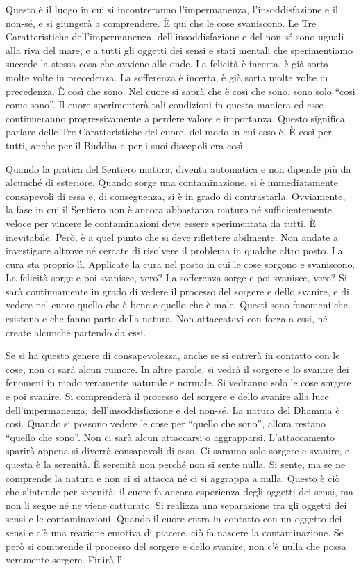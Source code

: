 Questo è il luogo in cui si incontreranno l'impermanenza,
l'insoddisfazione e il non-sé, e si giungerà a comprendere. È qui che le
cose svaniscono. Le Tre Caratteristiche dell'impermanenza,
dell'insoddisfazione e del non-sé sono uguali alla riva del mare, e a
tutti gli oggetti dei sensi e stati mentali che sperimentiamo succede la
stessa cosa che avviene alle onde. La felicità è incerta, è già sorta
molte volte in precedenza. La sofferenza è incerta, è già sorta molte
volte in precedenza. È così che sono. Nel cuore si saprà che è così che
sono, sono solo ``così come sono''. Il cuore sperimenterà tali
condizioni in questa maniera ed esse continueranno progressivamente a
perdere valore e importanza. Questo significa parlare delle Tre
Caratteristiche del cuore, del modo in cui esso è. È così per tutti,
anche per il Buddha e per i suoi discepoli era così

Quando la pratica del Sentiero matura, diventa automatica e non dipende
più da alcunché di esteriore. Quando sorge una contaminazione, si è
immediatamente consapevoli di essa e, di conseguenza, si è in grado di
contrastarla. Ovviamente, la fase in cui il Sentiero non è ancora
abbastanza maturo né sufficientemente veloce per vincere le
contaminazioni deve essere sperimentata da tutti. È inevitabile. Però, è
a quel punto che si deve riflettere abilmente. Non andate a investigare
altrove né cercate di risolvere il problema in qualche altro posto. La
cura sta proprio lì. Applicate la cura nel posto in cui le cose sorgono
e svaniscono. La felicità sorge e poi svanisce, vero? La sofferenza
sorge e poi svanisce, vero? Si sarà continuamente in grado di vedere il
processo del sorgere e dello svanire, e di vedere nel cuore quello che è
bene e quello che è male. Questi sono fenomeni che esistono e che fanno
parte della natura. Non attaccatevi con forza a essi, né create alcunché
partendo da essi.

Se si ha questo genere di consapevolezza, anche se si entrerà in
contatto con le cose, non ci sarà alcun rumore. In altre parole, si
vedrà il sorgere e lo svanire dei fenomeni in modo veramente naturale e
normale. Si vedranno solo le cose sorgere e poi svanire. Si comprenderà
il processo del sorgere e dello svanire alla luce dell'impermanenza,
dell'insoddisfazione e del non-sé. La natura del Dhamma è così. Quando
si possono vedere le cose per ``quello che sono'', allora restano
``quello che sono''. Non ci sarà alcun attaccarsi o aggrapparsi.
L'attaccamento sparirà appena si diverrà consapevoli di esso. Ci saranno
solo sorgere e svanire, e questa è la serenità. È serenità non perché
non si sente nulla. Si sente, ma se ne comprende la natura e non ci si
attacca né ci si aggrappa a nulla. Questo è ciò che s'intende per
serenità: il cuore fa ancora esperienza degli oggetti dei sensi, ma non
li segue né ne viene catturato. Si realizza una separazione tra gli
oggetti dei sensi e le contaminazioni. Quando il cuore entra in contatto
con un oggetto dei sensi e c'è una reazione emotiva di piacere, ciò fa
nascere la contaminazione. Se però si comprende il processo del sorgere
e dello svanire, non c'è nulla che possa veramente sorgere. Finirà lì.

